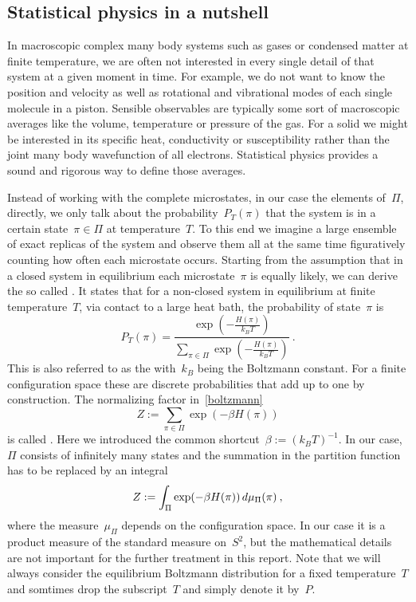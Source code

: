 \subsection{Statistical physics in a nutshell}

In macroscopic complex many body systems such as gases or condensed matter at
finite temperature, we are often not interested in every single detail of that
system at a given moment in time. For example, we do not want to know the
position and velocity as well as rotational and vibrational modes of each single
molecule in a piston. Sensible observables are typically some sort of
macroscopic averages like the volume, temperature or pressure of the gas. For a
solid we might be interested in its specific heat, conductivity or
susceptibility rather than the joint many body wavefunction of all electrons.
Statistical physics provides a sound and rigorous way to define those averages.

Instead of working with the complete microstates, in our case the elements
of~$\Pi$, directly, we only talk about the probability~$P_{T}(\pi)$ that the
system is in a certain state~$\pi \in \Pi$ at temperature~$T$. To this end we
imagine a large ensemble of exact replicas of the system and observe them all at
the same time figuratively counting how often each microstate occurs. Starting
from the assumption that in a closed system in equilibrium each microstate~$\pi$
is equally likely, we can derive the so called . It
states that for a non-closed system in equilibrium at finite temperature~$T$,
\eg{} via contact to a large heat bath, the probability of state~$\pi$ is
%
\begin{equation}\label{boltzmann}
  P_{T}(\pi) = \frac{\exp \left(- \frac{H(\pi)}{k_B T}\right)}
  {\sum_{\pi \in \Pi} \exp \left(- \frac{H(\pi)}{k_B T}\right)}\:.
\end{equation}
%
This is also referred to as the 
with~$k_B$ being the Boltzmann constant. For a finite configuration space these
are discrete probabilities that add up to one by construction. The normalizing
factor in~\eqref{boltzmann}
%
\begin{equation}
  Z := \sum_{\pi \in \Pi} \exp(-\beta H(\pi))
\end{equation}
%
is called . Here we introduced the common
shortcut~$\beta := {(k_B T)}^{-1}$. In our case,~$\Pi$ consists of infinitely
many states and the summation in the partition function has to be replaced by an
integral
%
\begin{equation}
  Z := \int_{\Pi} \exp(-\beta H(\pi)) \,d\mu_{\Pi}(\pi)\:,
\end{equation}
%
where the measure~$\mu_{\Pi}$ depends on the configuration space. In our case it
is a product measure of the standard measure on~$S^2$, but the mathematical
details are not important for the further treatment in this report. Note that we
will always consider the equilibrium Boltzmann distribution for a fixed
temperature~$T$ and somtimes drop the subscript~$T$ and simply denote it by~$P$.

